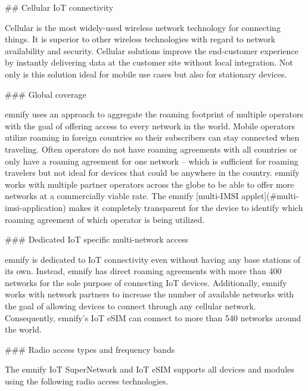 \documentclass[11pt, oneside]{article}   	%
\newcommand{\addspace}{\vspace{2mm}}
\begin{document}
\begin{markdown}

## Cellular IoT connectivity 

Cellular is the most widely-used wireless network technology for connecting things.
It is superior to other wireless technologies with regard to network availability and security.
Cellular solutions improve the end-customer experience by instantly delivering data at the customer site without local integration.
Not only is this solution ideal for mobile use cases but also for stationary devices.

### Global coverage

emnify uses an approach to aggregate the roaming footprint of multiple operators with the goal of offering access to every network in the world.
Mobile operators utilize roaming in foreign countries so their subscribers can stay connected when traveling.
Often operators do not have roaming agreements with all countries or only have a roaming agreement for one network -- which is sufficient for roaming travelers but not ideal for devices that could be anywhere in the country.
emnify works with multiple partner operators across the globe to be able to offer more networks at a commercially viable rate.
The emnify [multi-IMSI applet](#multi-imsi-application) makes it completely transparent for the device to identify which roaming agreement of which operator is being utilized.

### Dedicated IoT specific multi-network access  

emnify is dedicated to IoT connectivity even without having any base stations of its own.
Instead, emnify has direct roaming agreements with more than 400 networks for the sole purpose of connecting IoT devices. Additionally, emnify works with network partners to increase the number of available networks with the goal of allowing devices to connect through any cellular network.
Consequently, emnify's IoT eSIM can connect to more than 540 networks around the world.

### Radio access types and frequency bands

The emnify IoT SuperNetwork and IoT eSIM  supports all devices and modules using the following radio access technologies.
\end{markdown}
\addspace
{}
\end{document}

